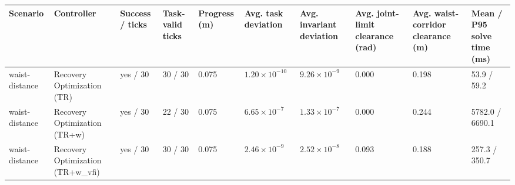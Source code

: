 \begin{tabular}{llllllllll}
\toprule
Scenario & Controller & Success / ticks & Task-valid ticks & Progress (m) & Avg. task deviation & Avg. invariant deviation & Avg. joint-limit clearance (rad) & Avg. waist-corridor clearance (m) & Mean / P95 solve time (ms) \\
\midrule
waist-distance & Recovery Optimization (TR) & yes / 30 & 30 / 30 & 0.075 & $1.20\times 10^{-10}$ & $9.26\times 10^{-9}$ & 0.000 & 0.198 & 53.9 / 59.2 \\
waist-distance & Recovery Optimization (TR+w) & yes / 30 & 22 / 30 & 0.075 & $6.65\times 10^{-7}$ & $1.33\times 10^{-7}$ & 0.000 & 0.244 & 5782.0 / 6690.1 \\
waist-distance & Recovery Optimization (TR+w\_vfi) & yes / 30 & 30 / 30 & 0.075 & $2.46\times 10^{-9}$ & $2.52\times 10^{-8}$ & 0.093 & 0.188 & 257.3 / 350.7 \\
\bottomrule
\end{tabular}
